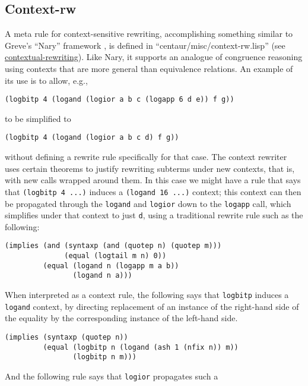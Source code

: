 \subsection{Context-rw}

A meta rule for context-sensitive rewriting, accomplishing something
similar to Greve's ``Nary'' framework \cite{greve06}, is defined in
``centaur/misc/context-rw.lisp'' (see
\href{http://www.cs.utexas.edu/users/moore/acl2/manuals/current/manual/index.html?topic=ACL2\_\_\_\_CONTEXTUAL-REWRITING}{\underline{contextual-rewriting}}).
Like Nary, it supports an analogue of congruence reasoning using
contexts that are more general than equivalence relations.  An example
of its use is to allow, e.g.,
\begin{verbatim}
(logbitp 4 (logand (logior a b c (logapp 6 d e)) f g))
\end{verbatim}
\noindent to be simplified to
\begin{verbatim}
(logbitp 4 (logand (logior a b c d) f g))
\end{verbatim}
without defining a rewrite rule specifically for that case. The
context rewriter uses certain theorems to justify rewriting subterms
under new contexts, that is, with new calls wrapped around them.  In
this case we might have a rule that says that \texttt{(logbitp 4 ...)}
induces a \texttt{(logand 16 ...)} context; this context can then be
propagated through the \texttt{logand} and \texttt{logior} down to the
\texttt{logapp} call, which simplifies under that context to just
\texttt{d}, using a traditional rewrite rule such as the following:
\begin{verbatim}
(implies (and (syntaxp (and (quotep n) (quotep m)))
              (equal (logtail m n) 0))
         (equal (logand n (logapp m a b))
                (logand n a)))
\end{verbatim}
\noindent When interpreted as a context rule, the following says that
\texttt{logbitp} induces a \texttt{logand} context, by directing
replacement of an instance of the right-hand side of the equality by
the corresponding instance of the left-hand side.
\begin{verbatim}
(implies (syntaxp (quotep n))
         (equal (logbitp n (logand (ash 1 (nfix n)) m))
                (logbitp n m)))
\end{verbatim}
\noindent And the following rule says that \texttt{logior} propagates such a

